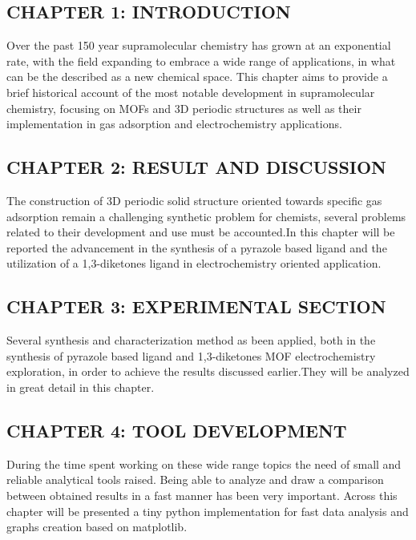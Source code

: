 \documentclass[a4,11pt]{report}
\begin{document}
\subsection*{CHAPTER 1: INTRODUCTION}
Over the past 150 year supramolecular chemistry has grown at an exponential rate, with the field expanding to embrace a wide range of applications, in what can be the described as a new chemical space. This chapter aims to provide a brief historical account of the most notable development in supramolecular chemistry, focusing on MOFs and 3D periodic structures as well as their implementation in gas adsorption and electrochemistry applications.
\newline\subsection*{CHAPTER 2: RESULT AND DISCUSSION}
The construction of 3D periodic solid structure oriented towards specific gas adsorption remain a challenging synthetic problem for chemists, several problems related to their development and use must be accounted.In this chapter will be reported the advancement in the synthesis of a pyrazole based ligand and the utilization of a 1,3-diketones ligand in electrochemistry oriented application.
\newline\subsection*{CHAPTER 3: EXPERIMENTAL SECTION}
Several synthesis and characterization method as been applied, both in the synthesis of pyrazole based ligand and 1,3-diketones MOF electrochemistry exploration, in order to achieve the results discussed earlier.They will be analyzed in great detail in this chapter.
\newline\subsection*{CHAPTER 4: TOOL DEVELOPMENT}
During the time spent working on these wide range topics the need of small and reliable analytical tools raised. Being able to analyze and draw a comparison between obtained results in a fast manner has been very important. Across this chapter will be presented a tiny python implementation for fast data analysis and graphs creation based on matplotlib.

\newpage
\tableofcontents









\end{document}
